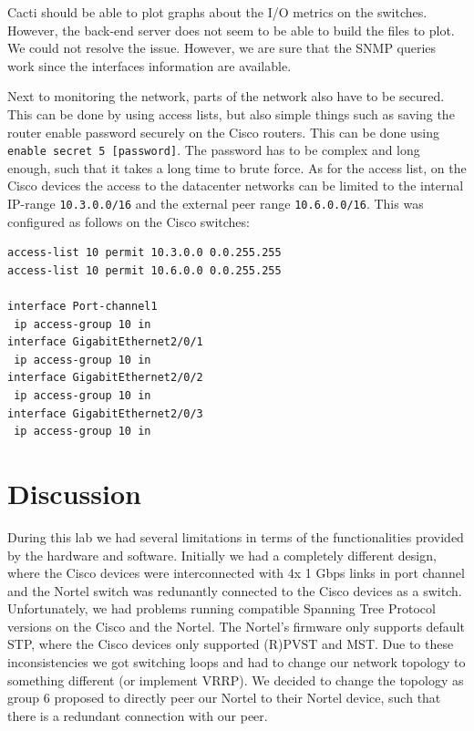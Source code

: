 \documentclass[10pt,a4paper]{article}
\begin{document}
Cacti should be able to plot graphs about the I/O metrics on the switches. However, the back-end server does not seem to be able to build the files to plot. We could not resolve the issue. However, we are sure that the SNMP queries work since the interfaces information are available.

Next to monitoring the network, parts of the network also have to be secured. This can be done by using access lists, but also simple things such as saving the router enable password securely on the Cisco routers. This can be done using \texttt{enable secret 5 [password]}. The password has to be complex and long enough, such that it takes a long time to brute force. As for the access list, on the Cisco devices the access to the datacenter networks can be limited to the internal IP-range \texttt{10.3.0.0/16} and the external peer range \texttt{10.6.0.0/16}. This was configured as follows on the Cisco switches:
\begin{verbatim}
access-list 10 permit 10.3.0.0 0.0.255.255
access-list 10 permit 10.6.0.0 0.0.255.255

interface Port-channel1
 ip access-group 10 in
interface GigabitEthernet2/0/1
 ip access-group 10 in
interface GigabitEthernet2/0/2
 ip access-group 10 in
interface GigabitEthernet2/0/3
 ip access-group 10 in
\end{verbatim}


\section{Discussion}
During this lab we had several limitations in terms of the functionalities provided by the hardware and software. Initially we had a completely different design, where the Cisco devices were interconnected with 4x 1 Gbps links in port channel and the Nortel switch was redunantly connected to the Cisco devices as a switch. Unfortunately, we had problems running compatible Spanning Tree Protocol versions on the Cisco and the Nortel. The Nortel's firmware only supports default STP, where the Cisco devices only supported (R)PVST and MST. Due to these inconsistencies we got switching loops and had to change our network topology to something different (or implement VRRP). We decided to change the topology as group 6 proposed to directly peer our Nortel to their Nortel device, such that there is a redundant connection with our peer.

\newpage



\end{document}
